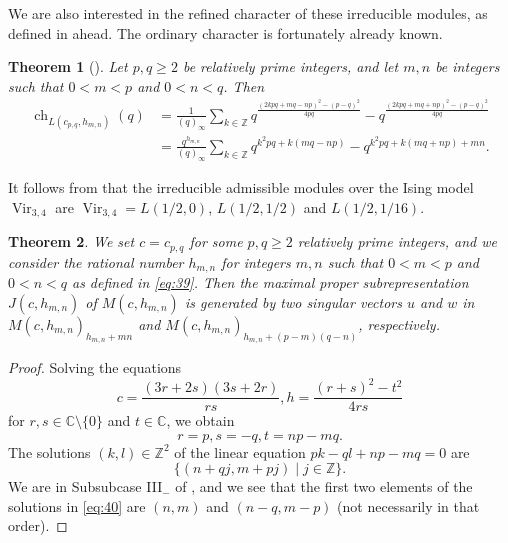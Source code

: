 \documentclass[a4paper, 12pt, reqno]{amsart}
\newtheorem{theorem}{Theorem}[section]
\theoremstyle{remark}
\DeclareMathOperator{\Vir}{Vir}
\DeclareMathOperator{\ch}{ch}
\begin{document}
We are also interested in the refined character of these irreducible modules, as defined in  ahead.
The ordinary character is fortunately already known.

\begin{theorem}[{\cite{feigin_verma_1984}}]
  \label{thr:45}
  Let $p, q \ge 2$ be relatively prime integers, and let $m, n$ be integers such that $0 < m < p$ and $0 < n < q$.
  Then
  \begin{align*}
    \ch_{L(c_{p, q}, h_{m, n})}(q) &= \frac{1}{(q)_{\infty}}\sum_{k \in \mathbb{Z}}q^{\frac{(2kpq + mq - np)^2 - (p - q)^2}{4pq}} - q^{\frac{(2kpq + mq + np)^2 - (p - q)^2}{4pq}} \\
                                   &= \frac{q^{h_{m, n}}}{(q)_{\infty}}\sum_{k \in \mathbb{Z}}q^{k^2pq + k(mq - np)} - q^{k^2pq + k(mq + np) + mn}.
  \end{align*}
\end{theorem}

It follows from  that the irreducible admissible modules over the Ising model $\Vir_{3, 4}$ are $\Vir_{3, 4} = L(1/2, 0)$, $L(1/2, 1/2)$ and $L(1/2, 1/16)$.

\begin{theorem}
  \label{thr:46}
  We set $c = c_{p, q}$ for some $p, q \ge 2$ relatively prime integers, and we consider the rational number $h_{m, n}$ for integers $m, n$ such that $0 < m < p$ and $0 < n < q$ as defined in \eqref{eq:39}.
  Then the maximal proper subrepresentation $J(c, h_{m, n})$ of $M(c, h_{m, n})$ is generated by two singular vectors $u$ and $w$ in $M(c, h_{m, n})_{h_{m, n} + mn}$ and $M(c, h_{m, n})_{h_{m, n} + (p - m)(q - n)}$, respectively.
\end{theorem}

\begin{proof}
  Solving the equations
  \begin{equation*}
    c = \frac{(3r + 2s)(3s + 2r)}{rs}, h = \frac{(r + s)^2 - t^2}{4rs}
  \end{equation*}
  for $r, s \in \mathbb{C} \setminus \{0\}$ and $t \in \mathbb{C}$, we obtain
  \begin{equation*}
    r = p, s = -q, t = np - mq.
  \end{equation*}
  The solutions $(k, l) \in \mathbb{Z}^2$ of the linear equation $pk - ql + np - mq = 0$ are
  \begin{equation}
    \label{eq:40}
    \{(n + qj, m + pj) \mid j \in \mathbb{Z}\}.
  \end{equation}
  We are in Subsubcase III$_-$ of , and we see that the first two elements of the solutions in \eqref{eq:40} are $(n, m)$ and $(n - q, m - p)$ (not necessarily in that order).
\end{proof}
\end{document}
